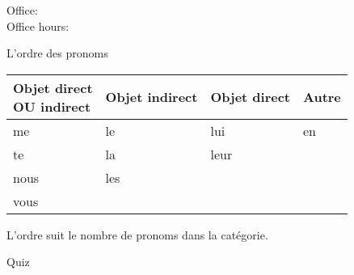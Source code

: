 \documentclass{beamer}
\subtitle[Pronoms compléments d'objet]{D'autres pronoms compléments d'objet}
\begin{document}
  \begin{frame}
    \titlepage
    \tiny{Office: \\
          Office hours: }
  \end{frame}

  \begin{frame}{L'ordre des pronoms}
    \centering
    \begin{tabular}{l | l | l | l}
      \parbox{0.2\linewidth}{Objet direct\\OU indirect} & Objet indirect & Objet direct & Autre \\
      \hline
      me                                                & le             & lui          & en \\
      te                                                & la             & leur         & \\
      nous                                              & les            &              & \\
      vous                                              &                &              & \\
    \end{tabular}

    \vspace{0.5cm}
    L'ordre suit  le nombre de pronoms dans la catégorie.
  \end{frame}

  \begin{frame}{}
  \end{frame}

  \begin{frame}{}
    \begin{center}
      \Large Quiz
    \end{center}
  \end{frame}
\end{document}
